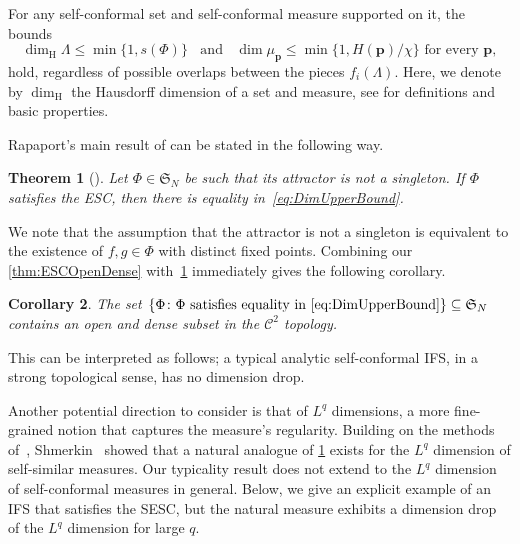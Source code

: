 \documentclass[11pt,]{article}
\def\cref#1{\ref{#1}}%
\newtheorem{theorem}{Theorem}[section]
\newtheorem{corollary}[theorem]{Corollary}
\theoremstyle{definition}
\theoremstyle{remark}
\newcommand{\0}{\mathbf{0}}
\numberwithin{equation}{section}
\begin{document}
For any self-conformal set and self-conformal measure supported on it, the bounds
\begin{equation}\label{eq:DimUpperBound}
\dim_{\mathrm{H}} \Lambda \leq \min\{1,s(\Phi)\}  \;\;\text{ and }\;\; \dim \mu_{\mathbf{p}} \leq
\min\{1, H(\mathbf{p})/\chi\} \text{ for every } \mathbf{p},
\end{equation} 
hold, regardless of possible overlaps between the pieces $f_i(\Lambda)$.
Here, we denote by $\dim_{\mathrm H}$ the Hausdorff dimension of a set and measure, see
\cite{FalconerBook} for definitions and basic properties.

Rapaport's main result of \cite{Rapaport_SelfConfESC25arXiv}
can be stated in the following way.

\begin{theorem}[\cite{Rapaport_SelfConfESC25arXiv}]\label{thm:RapaportMain}
  Let $\Phi\in\mathfrak{S}_N$ be such that its attractor is not a singleton. If
  $\Phi$ satisfies the ESC, then there is equality in~\cref{eq:DimUpperBound}.
\end{theorem}
We note that the assumption that the attractor is not a singleton is equivalent to the existence of
$f,g\in\Phi$ with distinct fixed points.
Combining our \cref{thm:ESCOpenDense} with~\cref{thm:RapaportMain} immediately gives the following corollary.

\begin{corollary}\label{cor:dim}
  The set $\{\Phi \colon \Phi \text{ satisfies equality in \cref{eq:DimUpperBound}}\}\subseteq
  \mathfrak{S}_N$ contains an open and dense subset in the $\mathcal{C}^2$ topology.
\end{corollary}
This can be interpreted as follows; a typical analytic self-conformal IFS, in a strong topological
sense, has no dimension drop.

Another potential direction to consider is that of $L^q$ dimensions, a more fine-grained notion that
captures the measure's regularity.  Building on the methods of~\cite{Hochman_SelfSimESC_Annals},
Shmerkin~\cite{Shmerkin_LqSelfSim_Annals} showed that a natural analogue of \cref{thm:RapaportMain}
exists for the $L^q$ dimension of self-similar measures. 
Our typicality result does not extend to the $L^q$ dimension of self-conformal measures in general.
Below, we give an explicit example of an IFS that satisfies the SESC, but the natural measure
exhibits a dimension drop of the $L^q$ dimension for large $q$.


\end{document}
